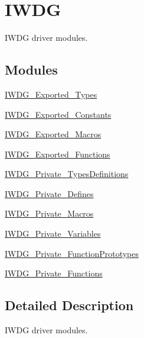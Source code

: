 \hypertarget{group___i_w_d_g}{}\section{I\+W\+DG}
\label{group___i_w_d_g}


I\+W\+DG driver modules.  


\subsection*{Modules}
\begin{DoxyCompactItemize}
\item 
\hyperlink{group___i_w_d_g___exported___types}{I\+W\+D\+G\+\_\+\+Exported\+\_\+\+Types}
\item 
\hyperlink{group___i_w_d_g___exported___constants}{I\+W\+D\+G\+\_\+\+Exported\+\_\+\+Constants}
\item 
\hyperlink{group___i_w_d_g___exported___macros}{I\+W\+D\+G\+\_\+\+Exported\+\_\+\+Macros}
\item 
\hyperlink{group___i_w_d_g___exported___functions}{I\+W\+D\+G\+\_\+\+Exported\+\_\+\+Functions}
\item 
\hyperlink{group___i_w_d_g___private___types_definitions}{I\+W\+D\+G\+\_\+\+Private\+\_\+\+Types\+Definitions}
\item 
\hyperlink{group___i_w_d_g___private___defines}{I\+W\+D\+G\+\_\+\+Private\+\_\+\+Defines}
\item 
\hyperlink{group___i_w_d_g___private___macros}{I\+W\+D\+G\+\_\+\+Private\+\_\+\+Macros}
\item 
\hyperlink{group___i_w_d_g___private___variables}{I\+W\+D\+G\+\_\+\+Private\+\_\+\+Variables}
\item 
\hyperlink{group___i_w_d_g___private___function_prototypes}{I\+W\+D\+G\+\_\+\+Private\+\_\+\+Function\+Prototypes}
\item 
\hyperlink{group___i_w_d_g___private___functions}{I\+W\+D\+G\+\_\+\+Private\+\_\+\+Functions}
\end{DoxyCompactItemize}


\subsection{Detailed Description}
I\+W\+DG driver modules. 

